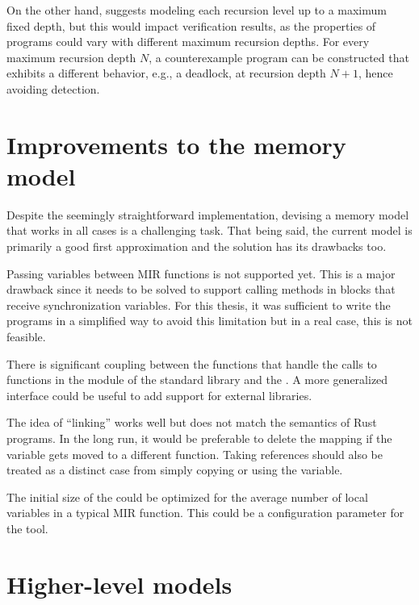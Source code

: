 On the other hand, \cite{meyer2020} suggests
modeling each recursion level up to a maximum fixed depth,
but this would impact verification results,
as the properties of programs could vary with different maximum recursion depths.
For every maximum recursion depth $N$, a counterexample program can be constructed that exhibits
a different behavior, e.g., a deadlock, at recursion depth $N+1$, hence avoiding detection.

\section{Improvements to the memory model}
\label{sec:future-work-memory-model}

Despite the seemingly straightforward implementation,
devising a memory model that works in all cases is a challenging task.
That being said, the current model is primarily a good first approximation
and the solution has its drawbacks too.

Passing variables between \acrshort{MIR} functions is not supported yet.
This is a major drawback since it needs to be solved to support calling methods
in  blocks that receive synchronization variables.
For this thesis, it was sufficient to write the programs in a simplified way to
avoid this limitation but in a real case, this is not feasible.

There is significant coupling between the functions that handle the calls to
functions in the  module of the standard library and the .
A more generalized interface could be useful to add support for external libraries.

The idea of ``linking'' works well but does not match the semantics of Rust programs.
In the long run, it would be preferable to delete the mapping
if the variable gets moved to a different function.
Taking references should also be treated as a distinct case
from simply copying or using the variable.

The initial size of the  could be optimized
for the average number of local variables in a typical \acrshort{MIR} function.
This could be a configuration parameter for the tool.

\section{Higher-level models}
\label{sec:future-work-higher-level-models}


